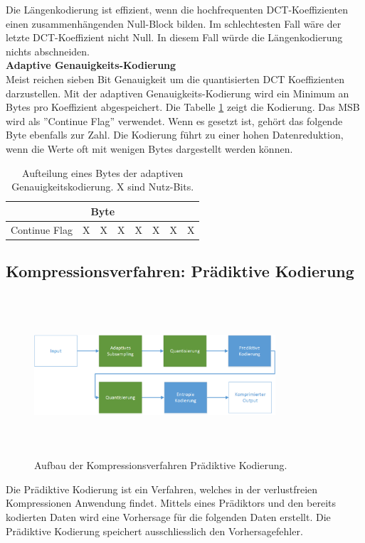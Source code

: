 Die Längenkodierung ist effizient, wenn die hochfrequenten DCT-Koeffizienten einen zusammenhängenden Null-Block bilden. Im schlechtesten Fall wäre der letzte DCT-Koeffizient nicht Null. In diesem Fall würde die Längenkodierung nichts abschneiden.\\

\textbf{Adaptive Genauigkeits-Kodierung}\\
Meist reichen sieben Bit Genauigkeit um die quantisierten DCT Koeffizienten darzustellen. Mit der adaptiven Genauigkeits-Kodierung wird ein Minimum an Bytes pro Koeffizient abgespeichert. Die Tabelle \ref{konzept:loesung1:entropie:adaptive} zeigt die Kodierung. Das MSB wird als ''Continue Flag'' verwendet. Wenn es gesetzt ist, gehört das folgende Byte ebenfalls zur Zahl. Die Kodierung führt zu einer hohen Datenreduktion, wenn die Werte oft mit wenigen Bytes dargestellt werden können.

\begin{table}[!htbp]
	\center
	\begin{tabular}{|c|c|c|c||c|c|c|c|}
	\hline
	\multicolumn{8}{|c|}{Byte}\\\hline
	Continue Flag & X & X & X & X & X & X & X \\\hline
	\end{tabular}
	\caption{Aufteilung eines Bytes der adaptiven Genauigkeitskodierung. X sind Nutz-Bits.}
	\label{konzept:loesung1:entropie:adaptive}
\end{table}
\pagebreak

\subsection{Kompressionsverfahren: Prädiktive Kodierung} \label{konzept:prediktiv}
\begin{figure}[!htbp]
	\center
	\includegraphics[width=0.8\textwidth,height=6cm,keepaspectratio]{./pictures/konzept/solution2/aufbau.png}
	\caption{Aufbau der Kompressionsverfahren Prädiktive Kodierung.}
	\label{konzept:loesung2:aufbau}
\end{figure}
Die Prädiktive Kodierung ist ein Verfahren, welches in der verlustfreien Kompressionen Anwendung findet. Mittels eines Prädiktors und den bereits kodierten Daten wird eine Vorhersage für die folgenden Daten erstellt. Die Prädiktive Kodierung speichert ausschliesslich den Vorhersagefehler.

